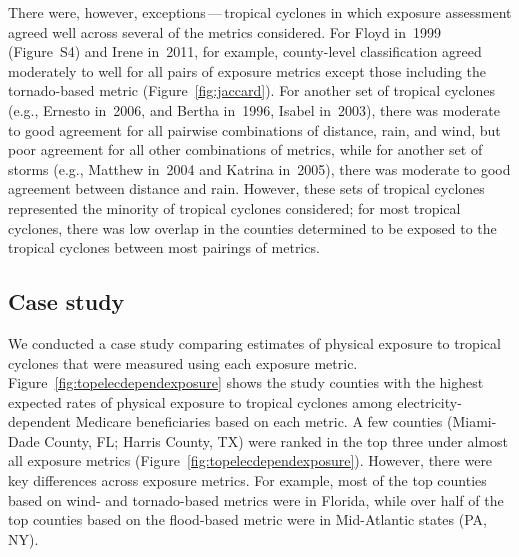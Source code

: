 There were, however, exceptions\,---\,tropical cyclones in which exposure
assessment agreed well across several of the metrics considered.  For Floyd
in~1999 (Figure~S4) and Irene in~2011, for example, county-level classification
agreed moderately to well for all pairs of exposure metrics except those
including the tornado-based metric (Figure~\ref{fig:jaccard}). For another set
of tropical cyclones (e.g., Ernesto in~2006, and Bertha in~1996, Isabel
in~2003), there was moderate to good agreement for all pairwise combinations of
distance, rain, and wind, but poor agreement for all other combinations of
metrics, while for another set of storms (e.g., Matthew in~2004 and Katrina
in~2005), there was moderate to good agreement between distance and rain.
However, these sets of tropical cyclones represented the minority of tropical
cyclones considered; for most tropical cyclones, there was low overlap in the
counties determined to be exposed to the tropical cyclones between most
pairings of metrics.

\subsection*{Case study}

We conducted a case study comparing estimates of physical exposure to
tropical cyclones that were measured using each exposure metric.
Figure~\ref{fig:topelecdependexposure} shows the study counties with the
highest expected rates of physical exposure to tropical cyclones among
electricity-dependent Medicare beneficiaries based on each metric. A few
counties (Miami-Dade County, FL; Harris County, TX) were ranked in the top
three under almost all exposure metrics
(Figure~\ref{fig:topelecdependexposure}). However, there were key differences
across exposure metrics. For example, most of the top counties based on wind-
and tornado-based metrics were in Florida, while over half of the top counties
based on the flood-based metric were in Mid-Atlantic states (PA, NY).



